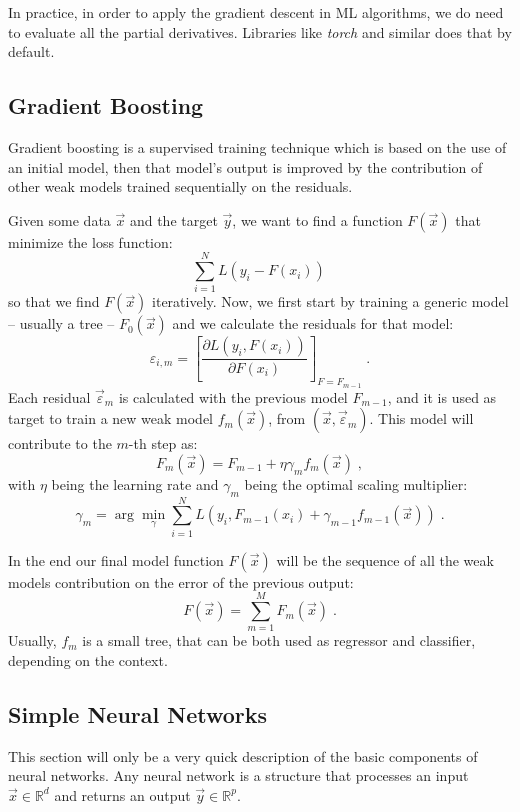 \documentclass[12pt,a4paper]{article}
\begin{document}
In practice, in order to apply the gradient descent in ML algorithms, we do need to evaluate all the partial derivatives. Libraries like \emph{torch} and similar does that by default.

\subsection{Gradient Boosting}
Gradient boosting is a supervised training technique which is based on the use of an initial model, then that model's output is improved by the contribution of other weak models trained sequentially on the residuals.

Given some data $\vec{x}$ and the target $\vec{y}$, we want to find a function $F(\vec{x})$ that minimize the loss function:
\begin{equation*}
	\sum_{i=1}^N L(y_i-F(x_i))\,
\end{equation*}
so that we find $F(\vec{x})$ iteratively. Now, we first start by training a generic model -- usually a tree -- $F_0(\vec{x})$ and we calculate the residuals for that model:
\begin{equation*}
	\varepsilon_{i,m} = \left[ \dfrac{\partial L(y_i, F(x_i))}{\partial F(x_i)}\right]_{F=F_{m-1}}\;.
\end{equation*}
Each residual $\vec{\varepsilon}_{m}$ is calculated with the previous model $F_{m-1}$, and it is used as target to train a new weak model $f_m(\vec{x})$, from $(\vec{x}, \vec{\varepsilon}_m)$. This model will contribute to the $m$-th step as:
\begin{equation*}
	F_m(\vec{x}) = F_{m-1} + \eta \gamma_m f_m(\vec{x})\;,
\end{equation*}
with $\eta$ being the learning rate and $\gamma_m$ being the optimal scaling multiplier:
\begin{equation*}
	\gamma_m = \arg \min_\gamma \sum_{i=1}^{N} L(y_i, F_{m-1}(x_i) + \gamma_{m-1} f_{m-1}(\vec{x})) \;.
\end{equation*}

In the end our final model function $F(\vec{x})$ will be the sequence of all the weak models contribution on the error of the previous output:
\begin{equation*}
	F(\vec{x}) = \sum_{m=1}^{M} F_m(\vec{x})\;.
\end{equation*}
Usually, $f_m$ is a small tree, that can be both used as regressor and classifier, depending on the context.



\subsection{Simple Neural Networks}
This section will only be a very quick description of the basic components of neural networks. Any neural network is a structure that processes an input $\vec{x}\in \mathbb{R}^d$ and returns an output $\vec{y}\in \mathbb{R}^p$.
\end{document}
